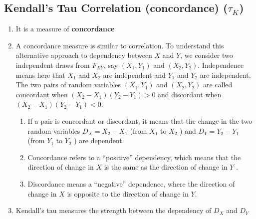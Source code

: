 \subsection{Kendall’s Tau Correlation (concordance) ($\tau_K$)}


\begin{enumerate}
    \item It is a measure of \textbf{concordance}
    \hfill \cite{statistics/book/Statistics-for-Data-Scientists/Maurits-Kaptein}

    \item 
    \begin{definition}
        A concordance measure is similar to correlation. 
        To understand this alternative approach to dependency between $X$ and $Y$, we consider two independent draws from $F _{X Y}$, say $(X_1, Y_1)$ and $(X_2, Y_2)$. 
        Independence means here that $X_1$ and $X_2$ are independent and $Y_1$ and $Y_2$ are independent. 
        The two pairs of random variables $(X_1, Y_1)$ and $(X_2, Y_2)$ are called concordant when $(X_2 - X_1)(Y_2 - Y_1) > 0$ and discordant when $(X_2 - X_1)(Y_2 - Y_1) < 0$. 
        \hfill \cite{statistics/book/Statistics-for-Data-Scientists/Maurits-Kaptein}
    \end{definition}
    \begin{enumerate}
        \item If a pair is concordant or discordant, it means that the change in the two random variables $D_X = X_2 - X_1$ (from $X_1$ to $X_2$ ) and $D_Y = Y_2 - Y_1$ (from $Y_1$ to $Y_2$ ) are dependent. 
        \hfill \cite{statistics/book/Statistics-for-Data-Scientists/Maurits-Kaptein}
        
        \item Concordance refers to a “positive” dependency, which means that the direction of change in $X$ is the same as the direction of change in $Y$ . 
        \hfill \cite{statistics/book/Statistics-for-Data-Scientists/Maurits-Kaptein}
        
        \item Discordance means a “negative” dependence, where the direction of change in $X$ is opposite to the direction of change in $Y$.
        \hfill \cite{statistics/book/Statistics-for-Data-Scientists/Maurits-Kaptein}
    \end{enumerate}

    \item Kendall’s tau measures the strength between the dependency of $D_X$ and $D_Y$ 
    \hfill \cite{statistics/book/Statistics-for-Data-Scientists/Maurits-Kaptein}


\end{enumerate}
